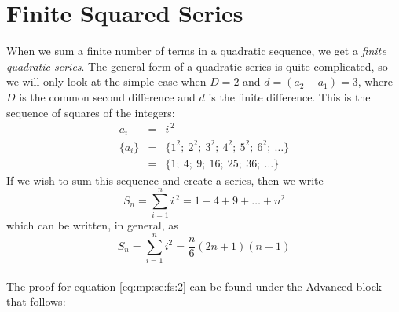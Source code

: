 \section{Finite Squared Series}
When we sum a finite number of terms in a quadratic sequence, we get a \textit{finite
quadratic series}. The general form of a quadratic series is quite complicated,
so we will only look at the simple case when $D=2$ and $d=(a_2 - a_1)=3$, where $D$ is the common second difference and $d$ is the finite difference. This is the sequence of squares of the integers:
\begin{eqnarray*}
\label{eq:mp:se:quad:seq}
a_i &=& i^{\,2} \\
\{a_i\} &=& \{1^2; \: 2^2; \: 3^2; \: 4^2; \: 5^2; \: 6^2; \: \ldots \} \\
&=& \{1; \: 4; \: 9; \: 16; \: 25; \: 36; \: \ldots \}
\end{eqnarray*}
If we wish to sum this sequence and create a series, then we write
\begin{equation*}
\label{eq:mp:se:fs:sum}
S_n=\sum_{i=1}^n i^{\,2} = 1 + 4 + 9 + \ldots + n^2
\end{equation*}
which can be written, in general, as
\begin{equation}
\label{eq:mp:se:fs:2}
\boxed{S_n = \sum_{i=1}^n i^2 = \frac{n}{6}(2n + 1)(n + 1)}
\end{equation}
\\
The proof for equation \eqref{eq:mp:se:fs:2} can be found under the Advanced block that follows:
\\
